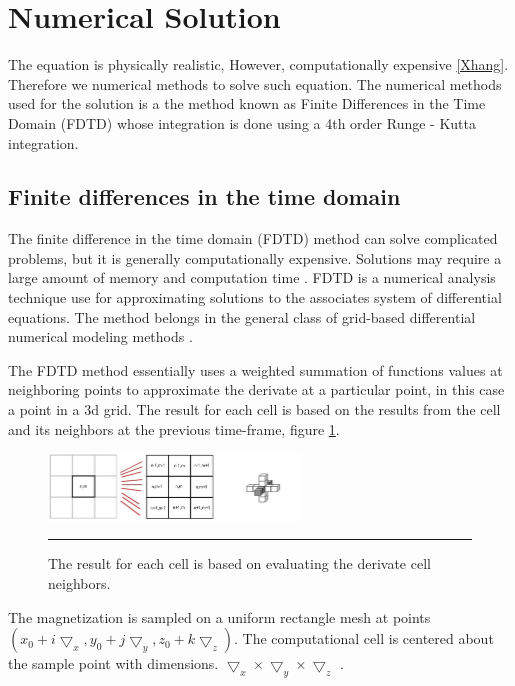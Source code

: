 \section{Numerical Solution}

The equation is physically realistic, However, computationally expensive \ref{Xhang}. Therefore we numerical methods to solve such equation. The numerical methods used for the solution is a the method known as Finite Differences in the Time Domain (FDTD) whose integration is done using a 4th order Runge - Kutta integration.

\subsection{Finite differences in the time domain}

The finite difference in the time domain (FDTD) method can solve complicated problems, but it is generally computationally expensive. Solutions may require a large amount of memory and computation time \cite{ufdtd}. FDTD is a numerical analysis technique use for approximating solutions to the associates system of differential equations. The method belongs in the general class of grid-based differential numerical modeling methods \cite{methods}.

The FDTD method essentially uses a weighted summation of functions values at neighboring points to approximate the derivate at a particular point, in this case a point in a 3d grid. The result for each cell is based on the results from the cell and its neighbors at the previous time-frame, figure \ref{fig:fdtd}.  

\begin{figure}[htbp]
	\centering
		\includegraphics[width=0.6\textwidth]{Figures/fdtd.png}
		\rule{35em}{0.2pt}
	\caption[FDTD grid]{The result for each cell is based on evaluating the derivate cell neighbors.}
	\label{fig:fdtd}
\end{figure}

The magnetization is sampled on a uniform rectangle mesh at points $(x_0 + i\bigtriangledown_x, y_0 + j\bigtriangledown_y, z_0 + k\bigtriangledown_z)$. The computational cell is centered about the sample point with dimensions. $\bigtriangledown_x \times \bigtriangledown_y \times \bigtriangledown_z$ \cite{methods}.

